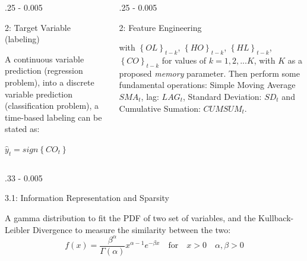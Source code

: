 \documentclass{postertheme}\usepackage[]{graphicx}\usepackage[]{color}
\begin{document}
\begin{frame}
\begin{columns}[onlytextwidth]
  \begin{column}{.25 \textwidth - 0.005 \textwidth}
    \begin{block}{2: Target Variable (labeling)} \footnotesize
    
    A continuous variable prediction (regression problem), into
    a discrete variable prediction (classification problem), a time-based labeling can be stated as:
      
      $\hat{y}_{t} = sign \left\{ CO_{t} \right\}$

    \end{block}
  \end{column}

  \begin{column}{.25 \textwidth - 0.005 \textwidth}
    \begin{block}{2: Feature Engineering} \footnotesize

     with $\left\{ OL \right\}_{t-k}$, $\left\{ HO \right\}_{t-k}$, $\left\{ HL \right\}_{t-k}$,
      $\left\{ CO \right\}_{t-k}$ for values of $k = 1, 2, ... K$, with $K$ as a proposed 
      \textit{memory} parameter. Then perform some fundamental operations: Simple Moving Average $SMA_{t}$,
      lag: $LAG_{t}$, Standard Deviation: $SD_t$ and Cumulative Sumation: $CUMSUM_{t}$.

    \end{block}
  \end{column}
  
\end{columns}


\begin{columns}[onlytextwidth]
  
  \begin{column}{.33 \textwidth - 0.005 \textwidth}
    \begin{block}{3.1: Information Representation and Sparsity}
    
    \footnotesize
    A gamma distribution to fit the PDF of two set of variables, and the Kullback-Leibler Divergence to measure 
    the similarity between the two:
    \begin{equation}
      f(x) = \frac{\beta^{\alpha}}{\Gamma(\alpha)} x^{\alpha - 1}e^{-\beta x} \quad \text{for}
      \quad x > 0 \quad \alpha,\beta >0 
    \end{equation}
    

\end{block}
\end{column}
\end{columns}
\end{frame}
\end{document}
